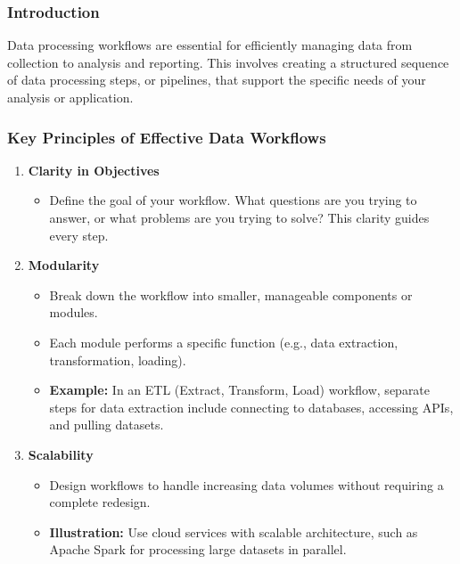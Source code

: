 \documentclass[aspectratio=169]{beamer}
\begin{document}
\begin{frame}
    \titlepage
\end{frame}

\begin{frame}
    \frametitle{Introduction}
    Data processing workflows are essential for efficiently managing data from collection to analysis and reporting. This involves creating a structured sequence of data processing steps, or pipelines, that support the specific needs of your analysis or application.
\end{frame}

\begin{frame}
    \frametitle{Key Principles of Effective Data Workflows}
    \begin{enumerate}
        \item \textbf{Clarity in Objectives}
        \begin{itemize}
            \item Define the goal of your workflow. What questions are you trying to answer, or what problems are you trying to solve? This clarity guides every step.
        \end{itemize}
        
        \item \textbf{Modularity}
        \begin{itemize}
            \item Break down the workflow into smaller, manageable components or modules.
            \item Each module performs a specific function (e.g., data extraction, transformation, loading).
            \item \textbf{Example:} In an ETL (Extract, Transform, Load) workflow, separate steps for data extraction include connecting to databases, accessing APIs, and pulling datasets.
        \end{itemize}
        
        \item \textbf{Scalability}
        \begin{itemize}
            \item Design workflows to handle increasing data volumes without requiring a complete redesign.
            \item \textbf{Illustration:} Use cloud services with scalable architecture, such as Apache Spark for processing large datasets in parallel.
        \end{itemize}
    \end{enumerate}
\end{frame}
\end{document}
